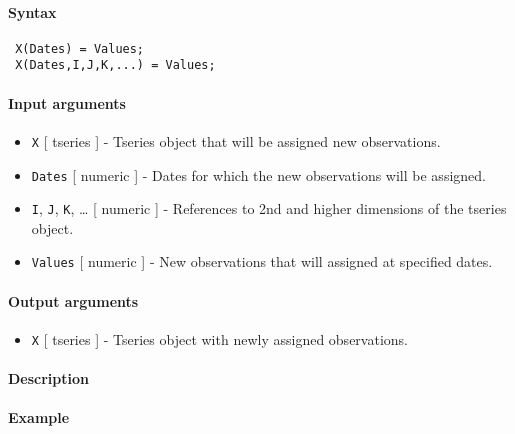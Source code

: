 


	\paragraph{Syntax}
 
 \begin{verbatim}
 X(Dates) = Values;
 X(Dates,I,J,K,...) = Values;
 \end{verbatim}
 
 \paragraph{Input arguments}
 
 \begin{itemize}
 \item
   \texttt{X} {[} tseries {]} - Tseries object that will be assigned new
   observations.
 \item
   \texttt{Dates} {[} numeric {]} - Dates for which the new observations
   will be assigned.
 \item
   \texttt{I}, \texttt{J}, \texttt{K}, \ldots{} {[} numeric {]} -
   References to 2nd and higher dimensions of the tseries object.
 \item
   \texttt{Values} {[} numeric {]} - New observations that will assigned
   at specified dates.
 \end{itemize}
 
 \paragraph{Output arguments}
 
 \begin{itemize}
 \item
   \texttt{X} {[} tseries {]} - Tseries object with newly assigned
   observations.
 \end{itemize}
 
 \paragraph{Description}
 
 \paragraph{Example}


